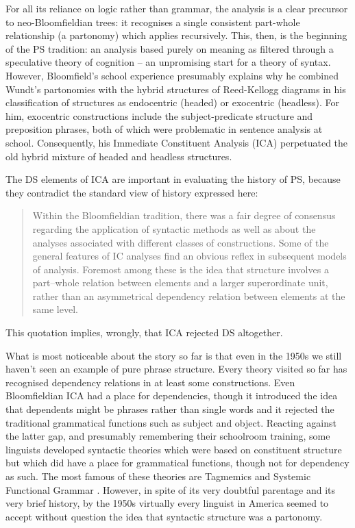 \documentclass[output=paper]{langscibook}
\begin{document}
For all its reliance on logic rather than grammar, the analysis is a clear precursor to neo-Bloomfieldian trees: it recognises a single consistent part-whole relationship (a partonomy) which applies recursively. This, then, is the beginning of the PS tradition: an analysis based purely on meaning as filtered through a speculative theory of cognition – an unpromising start for a theory of syntax. However, Bloomfield’s school experience presumably explains why he combined Wundt’s partonomies with the hybrid structures of Reed-Kellogg diagrams in his classification of structures as endocentric (headed) or exocentric (headless). For him, exocentric constructions include the subject-predicate structure and preposition phrases, both of which were problematic in sentence analysis at school. Consequently, his Immediate Constituent Analysis (ICA) perpetuated the old hybrid mixture of headed and headless structures.

The DS elements of ICA are important in evaluating the history of PS, because they contradict the standard view of history expressed here:

\begin{quotation}
	Within the Bloomfieldian tradition, there was a fair degree of consensus regarding the application of syntactic methods as well as about the analyses associated with different classes of constructions. Some of the general features of IC analyses find an obvious reflex in subsequent models of analysis. Foremost among these is the idea that structure involves a part–whole relation between elements and a larger superordinate unit, rather than an asymmetrical dependency relation between elements at the same level. \citep[202–203]{BlevinsSag2013}
\end{quotation}

This quotation implies, wrongly, that ICA rejected DS altogether.

What is most noticeable about the story so far is that even in the 1950s we still haven’t seen an example of pure phrase structure. Every theory visited so far has recognised dependency relations in at least some constructions. Even Bloomfieldian ICA had a place for dependencies, though it introduced the idea that dependents might be phrases rather than single words and it rejected the traditional grammatical functions such as subject and object. Reacting against the latter gap, and presumably remembering their schoolroom training, some linguists developed syntactic theories which were based on constituent structure but which did have a place for grammatical functions, though not for dependency as such. The most famous of these theories are Tagmemics \citep{Pike1954} and Systemic Functional Grammar \citep{Halliday1961,Halliday67b-u}. However, in spite of its very doubtful parentage and its very brief history, by the 1950s virtually every linguist in America seemed to accept without question the idea that syntactic structure was a partonomy.
\end{document}
